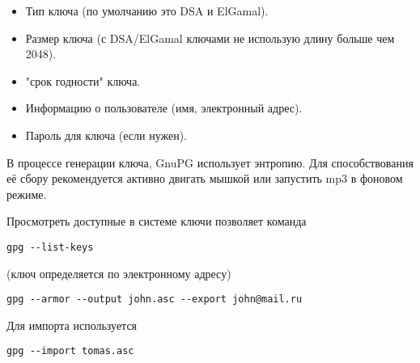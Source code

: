 \documentclass[10pt,a4paper]{article}
\begin{document}
\begin{itemize}
	\item{Тип ключа (по умолчанию это DSA и ElGamal).}
	\item{Размер ключа (с DSA/ElGamal ключами не использую длину больше чем 2048).}
	\item{"срок годности" ключа.}
	\item{Информацию о пользователе (имя, электронный адрес).}
	\item{Пароль для ключа (если нужен).}
\end{itemize}

В процессе генерации ключа, GnuPG использует энтропию. Для способствования её сбору рекомендуется активно двигать мышкой или запустить mp3 в фоновом режиме.

Просмотреть доступные в системе ключи позволяет команда
\begin{verbatim}gpg --list-keys
\end{verbatim}
(ключ определяется по электронному адресу)
\begin{verbatim}gpg --armor --output john.asc --export john@mail.ru
\end{verbatim}

Для импорта используется
\begin{verbatim}gpg --import tomas.asc
\end{verbatim}
\end{document}
